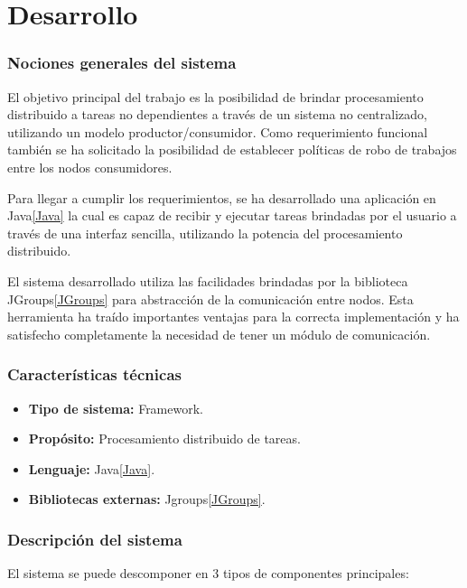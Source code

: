\documentclass[12pt,a4paper,oneside,spanish]{report}
\begin{document}
\chapter*{Desarrollo}

\subsection*{Nociones generales del sistema}

El objetivo principal del trabajo es la posibilidad de brindar procesamiento distribuido a tareas no dependientes a través de un sistema no centralizado, utilizando un modelo productor/consumidor. Como requerimiento funcional también se ha solicitado la posibilidad de establecer políticas de robo de trabajos entre los nodos consumidores.

Para llegar a cumplir los requerimientos, se ha desarrollado una aplicación en Java\ref{Java} la cual es capaz de recibir y ejecutar tareas brindadas por el usuario a través de una interfaz sencilla, utilizando la potencia del procesamiento distribuido.

El sistema desarrollado utiliza las facilidades brindadas por la biblioteca JGroups\ref{JGroups} para abstracción de la comunicación entre nodos. Esta herramienta ha traído importantes ventajas para la correcta implementación y ha satisfecho completamente la necesidad de tener un módulo de comunicación.

\subsection*{Características técnicas}

\begin{itemize}
	\item \textbf{Tipo de sistema:} Framework.
	\item \textbf{Propósito:} Procesamiento distribuido de tareas.
    \item \textbf{Lenguaje:} Java\ref{Java}.
    	\item \textbf{Bibliotecas externas:} Jgroups\ref{JGroups}.
\end{itemize}

\subsection*{Descripción del sistema}

El sistema se puede descomponer en 3 tipos de componentes principales:
\end{document}
